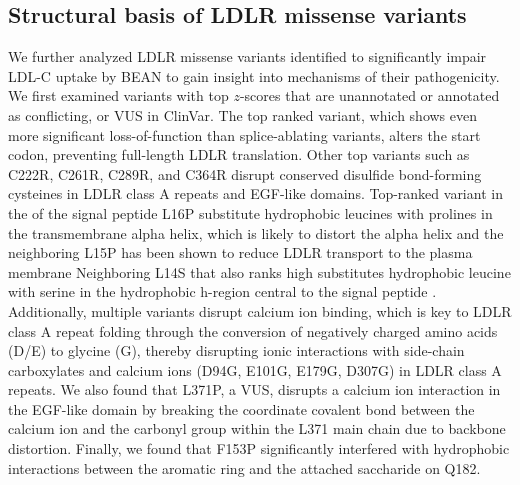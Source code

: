 \documentclass[a4paper, titlepage, openright]{book}
\begin{document}
\subsection{Structural basis of LDLR missense variants }
We further analyzed LDLR missense variants identified to significantly impair LDL-C uptake by BEAN to gain insight into mechanisms of their pathogenicity. We first examined variants with top $z$-scores that are unannotated or annotated as conflicting, or VUS in ClinVar. The top ranked variant, which shows even more significant loss-of-function than splice-ablating variants, alters the start codon, preventing full-length LDLR translation. Other top variants such as C222R, C261R, C289R, and C364R disrupt conserved disulfide bond-forming cysteines in LDLR class A repeats and EGF-like domains. Top-ranked variant in the of the signal peptide L16P  substitute hydrophobic leucines with prolines in the transmembrane alpha helix, which is likely to distort the alpha helix \citep{kim1999positional} and the  neighboring L15P has been shown to reduce LDLR transport to the plasma membrane \citep{pavlouvskova2016functional} Neighboring L14S that also ranks high substitutes hydrophobic leucine with serine in the hydrophobic h-region central to the signal peptide \citep{von1985signal}. Additionally, multiple variants disrupt calcium ion binding, which is key to LDLR class A repeat folding \citep{pena2010calcium} through the conversion of negatively charged amino acids (D/E) to glycine (G), thereby disrupting ionic interactions with side-chain carboxylates and calcium ions (D94G, E101G, E179G, D307G) in LDLR class A repeats. We also found that L371P, a VUS, disrupts a calcium ion interaction in the EGF-like domain by breaking the coordinate covalent bond between the calcium ion and the carbonyl group within the L371 main chain due to backbone distortion. Finally, we found that F153P significantly interfered with hydrophobic interactions between the aromatic ring and the attached saccharide on Q182.
\end{document}

